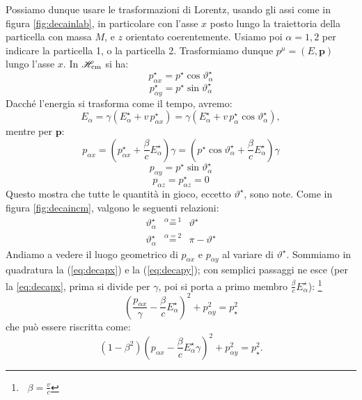 Possiamo dunque usare le trasformazioni di Lorentz, usando gli
assi come in f\mbox{}igura \vref{fig:decainlab}, in particolare
con l'asse $x$ posto lungo la traiettoria della particella con
massa $M$, e $z$ orientato coerentemente. Usiamo poi $\alpha=1,2$
per indicare la particella 1, o la particella 2. Trasformiamo
dunque $p^{\mu}=(E,\mathbf{p})$ lungo l'asse $x$. In $\mathscr{H}_{\mathrm{cm}}$ si ha:
$$
p_{\alpha x}^{\star}=p^{\star}\cos\vartheta_{\alpha}^{\star}
$$
$$
p_{\alpha y}^{\star}=p^{\star}\sin\vartheta_{\alpha}^{\star}
$$
Dacch\'e l'energia si trasforma come il tempo, avremo:
$$
E_{\alpha}=\gamma(E_{\alpha}^{\star}+v\,p_{\alpha
x}^{\star})=\gamma(E_{\alpha}^{\star}+v\,p_{\alpha
}^{\star}\cos\vartheta_{\alpha}^{\star}),
$$
mentre per $\mathbf{p}$:
\begin{equation}
p_{\alpha x}=(p^{\star}_{\alpha x} +
\frac{\beta}{c}E_{\alpha}^{\star})\gamma =
(p^{\star}\cos\vartheta_{\alpha}^{\star} +
\frac{\beta}{c}E_{\alpha}^{\star})\gamma \label{eq:decapx}
\end{equation}
\begin{equation}
p_{\alpha
y}=p^{\star}\sin\vartheta_{\alpha}^{\star}\label{eq:decapy}
\end{equation}
\begin{equation}
p_{\alpha z}=p_{\alpha z}^{\star}=0
\end{equation}
Questo mostra che tutte le quantit\`a in gioco, eccetto
$\vartheta^{\star}$, sono note. Come in f\mbox{}igura
\ref{fig:decaincm}, valgono le seguenti relazioni:
\begin{eqnarray*}
\vartheta^{\star}_{\alpha}&\stackrel{\alpha=1}{=}&\vartheta^{\star}\\
\vartheta^{\star}_{\alpha}&\stackrel{\alpha=2}{=}&\pi-\vartheta^{\star}
\end{eqnarray*}
Andiamo a vedere il luogo geometrico di $p_{\alpha x}$ e
$p_{\alpha y}$ al variare di $\vartheta^{\star}$. Sommiamo in
quadratura la (\ref{eq:decapx}) e la (\ref{eq:decapy}); con
semplici passaggi ne esce (per la \vref{eq:decapx}, prima si
divide per $\gamma$, poi si porta a primo membro
$\frac{\beta}{c}E^{\star}_{\alpha}$):%
\footnote{$\;\;\beta=\frac{v}{c}$}
\begin{equation}
\left(\frac{p_{\alpha
x}}{\gamma}-\frac{\beta}{c}E_{\alpha}^{\star}\right)^2+p_{\alpha
y}^2=p_{\star}^2
\end{equation}
che pu\`o essere riscritta come:
\begin{equation}
(1-\beta^2)\left(p_{\alpha
x}-\frac{\beta}{c}E_{\alpha}^{\star}\gamma\right)^2+p_{\alpha
y}^2=p_{\star}^2. \label{eq:decaellisse}
\end{equation}
